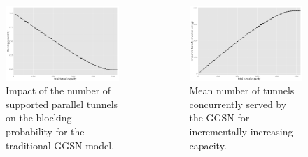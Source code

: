 \documentclass{beamer}
\begin{document}
\begin{frame}
	\begin{columns}
		\begin{figure}
			\includegraphics[width=\columnwidth]{../../chapters/04-mobilenets/images/R-monolithic-blocking.pdf}
			\caption{Impact of the number of supported parallel tunnels on the blocking probability for the traditional GGSN model.}
		\end{figure}

		\begin{figure}
			\includegraphics[width=\columnwidth]{../../chapters/04-mobilenets/images/R-monolithic-tunnelusage.pdf}
			\caption{Mean number of tunnels concurrently served by the GGSN for incrementally increasing capacity.}
		\end{figure}
	\end{columns}
\end{frame}
\end{document}
